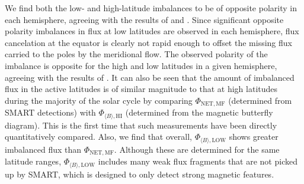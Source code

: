 \documentclass[namedreferences]{solarphysics}
\newcommand{\degr}{\ensuremath{^\circ}}
\begin{document}
\begin{article}
We find both the low- and high-latitude imbalances to be of opposite polarity in each hemisphere, agreeing with the results of \citet{Choudhary:2002} and \citet{zharkov:2006}. Since significant opposite polarity imbalances in flux at low latitudes are observed in each hemisphere, flux cancelation at the equator is clearly not rapid enough to offset the missing flux carried to the poles by the meridional flow. 
The observed polarity of the imbalance is opposite for the high and low latitudes in a given hemisphere, agreeing with the results of \citet{Zharkov:2008}. It can also be seen that the amount of imbalanced flux in the active latitudes is of similar magnitude to that at high latitudes during the majority of the solar cycle by comparing $\Phi_{\mathrm{NET,MF}}$ (determined from SMART detections)
with $\Phi_{\langle B \rangle,\mathrm{HI}}$ (determined from the magnetic butterfly diagram). This is the first time that such measurements have been directly quantitatively compared. Also, we find that overall, $\Phi_{\langle B \rangle,\mathrm{LOW}}$ shows greater imbalanced flux than $\Phi_{\mathrm{NET,MF}}$. Although these are determined for the same latitude ranges, $\Phi_{\langle B \rangle,\mathrm{LOW}}$ includes many weak flux fragments that are not picked up by SMART, which is designed to only detect strong magnetic features.




\end{article}
\end{document}
